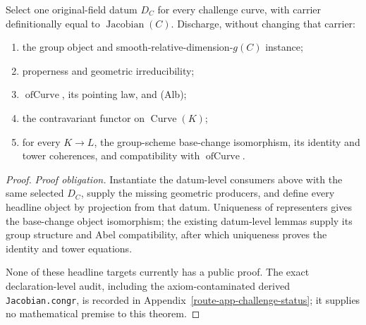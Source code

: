 \begin{theorem}
  \label{route-thm-phase8-assembly}
  \notready

  Select one original-field datum \(D_C\) for every challenge curve, with
  carrier definitionally equal to \(\operatorname{Jacobian}(C)\).  Discharge,
  without changing that carrier:
  \begin{enumerate}
  \item the group object and smooth-relative-dimension-\(g(C)\) instance;
  \item properness and geometric irreducibility;
  \item \(\operatorname{ofCurve}\), its pointing law, and (Alb);
  \item the contravariant functor on \(\operatorname{Curve}(K)\);
  \item for every \(K\to L\), the group-scheme base-change isomorphism, its
    identity and tower coherences, and compatibility with
    \(\operatorname{ofCurve}\).
  \end{enumerate}
\end{theorem}

\begin{proof}
  \emph{Proof obligation.}  Instantiate the datum-level
  consumers above with the same selected \(D_C\), supply the missing geometric
  producers, and define every headline object by projection from that datum.
  Uniqueness of representers gives the base-change object isomorphism; the
  existing datum-level lemmas supply its group structure and Abel compatibility,
  after which uniqueness proves the identity and tower equations.

  None of these headline targets currently has a public proof.  The exact
  declaration-level audit, including the axiom-contaminated derived
  \texttt{Jacobian.congr}, is recorded in
  Appendix~\ref{route-app-challenge-status}; it supplies no mathematical
  premise to this theorem.
\end{proof}
